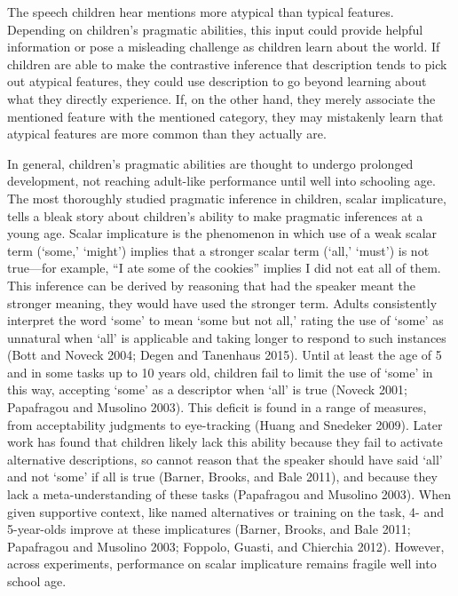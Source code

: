 \documentclass{ucetd}
\begin{document}
The speech children hear mentions more atypical than typical features.
Depending on children's pragmatic abilities, this input could provide
helpful information or pose a misleading challenge as children learn
about the world. If children are able to make the contrastive inference
that description tends to pick out atypical features, they could use
description to go beyond learning about what they directly experience.
If, on the other hand, they merely associate the mentioned feature with
the mentioned category, they may mistakenly learn that atypical features
are more common than they actually are.

In general, children's pragmatic abilities are thought to undergo
prolonged development, not reaching adult-like performance until well
into schooling age. The most thoroughly studied pragmatic inference in
children, scalar implicature, tells a bleak story about children's
ability to make pragmatic inferences at a young age. Scalar implicature
is the phenomenon in which use of a weak scalar term (`some,' `might')
implies that a stronger scalar term (`all,' `must') is not true---for
example, ``I ate some of the cookies'' implies I did not eat all of
them. This inference can be derived by reasoning that had the speaker
meant the stronger meaning, they would have used the stronger term.
Adults consistently interpret the word `some' to mean `some but not
all,' rating the use of `some' as unnatural when `all' is applicable and
taking longer to respond to such instances (Bott and Noveck 2004; Degen
and Tanenhaus 2015). Until at least the age of 5 and in some tasks up to
10 years old, children fail to limit the use of `some' in this way,
accepting `some' as a descriptor when `all' is true (Noveck 2001;
Papafragou and Musolino 2003). This deficit is found in a range of
measures, from acceptability judgments to eye-tracking (Huang and
Snedeker 2009). Later work has found that children likely lack this
ability because they fail to activate alternative descriptions, so
cannot reason that the speaker should have said `all' and not `some' if
all is true (Barner, Brooks, and Bale 2011), and because they lack a
meta-understanding of these tasks (Papafragou and Musolino 2003). When
given supportive context, like named alternatives or training on the
task, 4- and 5-year-olds improve at these implicatures (Barner, Brooks,
and Bale 2011; Papafragou and Musolino 2003; Foppolo, Guasti, and
Chierchia 2012). However, across experiments, performance on scalar
implicature remains fragile well into school age.
\end{document}
